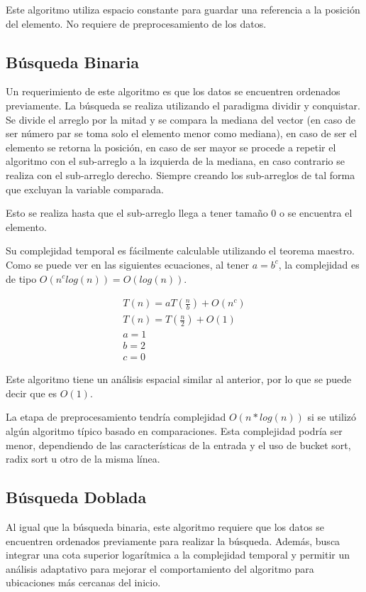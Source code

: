 \documentclass[]{article}
\begin{document}
Este algoritmo utiliza espacio constante para guardar una referencia a la posición del elemento. No requiere de preprocesamiento de los datos.

\subsection{Búsqueda Binaria}

Un requerimiento de este algoritmo es que los datos se encuentren ordenados previamente. La búsqueda se realiza utilizando el paradigma dividir y conquistar. Se divide el arreglo por la mitad y se compara la mediana del vector (en caso de ser número par se toma solo el elemento menor como mediana), en caso de ser el elemento se retorna la posición, en caso de ser mayor se procede a repetir el algoritmo con el sub-arreglo a la izquierda de la mediana, en caso contrario se realiza con el sub-arreglo derecho. Siempre creando los sub-arreglos de tal forma que excluyan la variable comparada.

Esto se realiza hasta que el sub-arreglo llega a tener tamaño 0 o se encuentra el elemento.

Su complejidad temporal es fácilmente calculable utilizando el teorema maestro. Como se puede ver en las siguientes ecuaciones, al tener $a=b^{c}$, la complejidad es de tipo $O(n^{c}log(n)) = O(log(n))$.

\begin{align*}
	T(n) = aT(\frac{n}{b}) + O(n^{c}) \\
	T(n) = T(\frac{n}{2}) + O(1) \\
	a = 1 \\
	b = 2 \\
	c = 0
\end{align*}

Este algoritmo tiene un análisis espacial similar al anterior, por lo que se puede decir que es $O(1)$.

La etapa de preprocesamiento tendría complejidad $O(n*log(n))$ si se utilizó algún algoritmo típico basado en comparaciones. Esta complejidad podría ser menor, dependiendo de las características de la entrada y el uso de bucket sort, radix sort u otro de la misma línea.

\subsection{Búsqueda Doblada}

Al igual que la búsqueda binaria, este algoritmo requiere que los datos se encuentren ordenados previamente para realizar la búsqueda. Además, busca integrar una cota superior logarítmica a la complejidad temporal y permitir un análisis adaptativo para mejorar el comportamiento del algoritmo para ubicaciones más cercanas del inicio.
\end{document}
